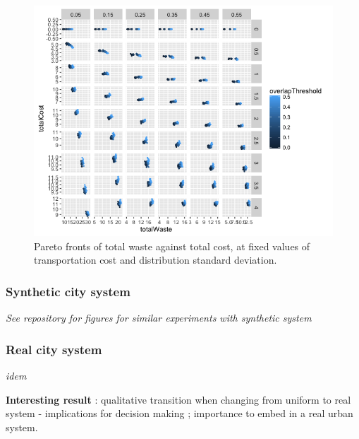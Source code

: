 \documentclass[fleqn,10pt]{wlscirep}
\begin{document}
{%
\begin{figure}
\hspace{-2cm}\includegraphics[width=1.3\textwidth]{figures/pareto_wasteCost_overlapThreshold}
\caption{Pareto fronts of total waste against total cost, at fixed values of transportation cost and distribution standard deviation.}
\label{fig:pareto}
\end{figure}



\subsubsection*{Synthetic city system}

\textit{See repository for figures for similar experiments with synthetic system}

\subsubsection*{Real city system}

\textit{idem}

\textbf{Interesting result} : qualitative transition when changing from uniform to real system - implications for decision making ; importance to embed in a real urban system.



}
\end{document}
